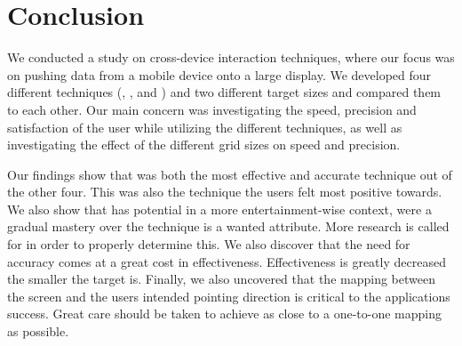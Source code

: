 \section{Conclusion}

We conducted a study on cross-device interaction techniques, where our focus was on pushing data from a mobile device onto a large display.
We developed four different techniques (\swipe, \tilt, \throw and \pinch) and two different target sizes and compared them to each other.
Our main concern was investigating the speed, precision and satisfaction of the user while utilizing the different techniques, as well as investigating the effect of the different grid sizes on speed and precision.  

Our findings show that \swipe was both the most effective and accurate technique out of the other four.
This was also the technique the users felt most positive towards.
We also show that \pinch has potential in a more entertainment-wise context, were a gradual mastery over the technique is a wanted attribute.
More research is called for in order to properly determine this.
We also discover that the need for accuracy comes at a great cost in effectiveness.
Effectiveness is greatly decreased the smaller the target is. 
Finally, we also uncovered that the mapping between the screen and the users intended pointing direction is critical to the applications success. 
Great care should be taken to achieve as close to a one-to-one mapping as possible. 